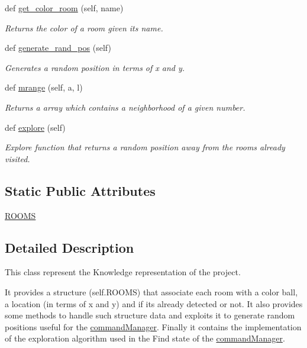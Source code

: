 \begin{DoxyCompactItemize}
def \hyperlink{classRooms_1_1Rooms_aaef9cac25b1cf6e0313868b7e704470e}{get\+\_\+color\+\_\+room} (self, name)
\begin{DoxyCompactList}\small\item\em Returns the color of a room given its name. \end{DoxyCompactList}\item 
def \hyperlink{classRooms_1_1Rooms_a3a531237af143d87bc70927a6ad84865}{generate\+\_\+rand\+\_\+pos} (self)
\begin{DoxyCompactList}\small\item\em Generates a random position in terms of x and y. \end{DoxyCompactList}\item 
def \hyperlink{classRooms_1_1Rooms_a8f7070d91a261e3d6b6f9be2ce78b96c}{mrange} (self, a, l)
\begin{DoxyCompactList}\small\item\em Returns a array which contains a neighborhood of a given number. \end{DoxyCompactList}\item 
def \hyperlink{classRooms_1_1Rooms_a031a0e30ceaada375d7b3aacced35668}{explore} (self)
\begin{DoxyCompactList}\small\item\em Explore function that returns a random position away from the rooms already visited. \end{DoxyCompactList}\end{DoxyCompactItemize}
\subsection*{Static Public Attributes}
\begin{DoxyCompactItemize}
\item 
\hyperlink{classRooms_1_1Rooms_a45a955141e4dd142491b43124c07ab95}{R\+O\+O\+MS}
\end{DoxyCompactItemize}


\subsection{Detailed Description}
This class represent the Knowledge representation of the project. 

It provides a structure (self.\+R\+O\+O\+MS) that associate each room with a color ball, a location (in terms of x and y) and if it\textquotesingle{}s already detected or not. It also provides some methods to handle such structure data and exploits it to generate random positions useful for the \hyperlink{namespacecommandManager}{command\+Manager}. Finally it contains the implementation of the exploration algorithm used in the Find state of the \hyperlink{namespacecommandManager}{command\+Manager}. 

